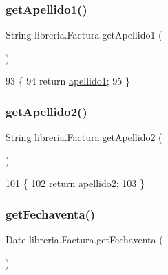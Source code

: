 \subsubsection{\texorpdfstring{get\+Apellido1()}{getApellido1()}}
{\footnotesize\ttfamily String libreria.\+Factura.\+get\+Apellido1 (\begin{DoxyParamCaption}{ }\end{DoxyParamCaption})\hspace{0.3cm}{\ttfamily [inline]}}


\begin{DoxyCode}
93                                  \{
94         \textcolor{keywordflow}{return} \mbox{\hyperlink{classlibreria_1_1_factura_a83e5ee3edddf7c91a71605ea4eeb9d5f}{apellido1}};
95     \}
\end{DoxyCode}
\mbox{\label{classlibreria_1_1_factura_a975f44149ea7ba75f8b5e596bbd6631a}} 
\subsubsection{\texorpdfstring{get\+Apellido2()}{getApellido2()}}
{\footnotesize\ttfamily String libreria.\+Factura.\+get\+Apellido2 (\begin{DoxyParamCaption}{ }\end{DoxyParamCaption})\hspace{0.3cm}{\ttfamily [inline]}}


\begin{DoxyCode}
101                                  \{
102         \textcolor{keywordflow}{return} \mbox{\hyperlink{classlibreria_1_1_factura_af91345af6a4d1ae15efc26bd3ef29524}{apellido2}};
103     \}
\end{DoxyCode}
\mbox{\label{classlibreria_1_1_factura_a80b988d054efbab2424cbe791ba91afc}} 
\subsubsection{\texorpdfstring{get\+Fechaventa()}{getFechaventa()}}
{\footnotesize\ttfamily Date libreria.\+Factura.\+get\+Fechaventa (\begin{DoxyParamCaption}{ }\end{DoxyParamCaption})\hspace{0.3cm}{\ttfamily [inline]}}


